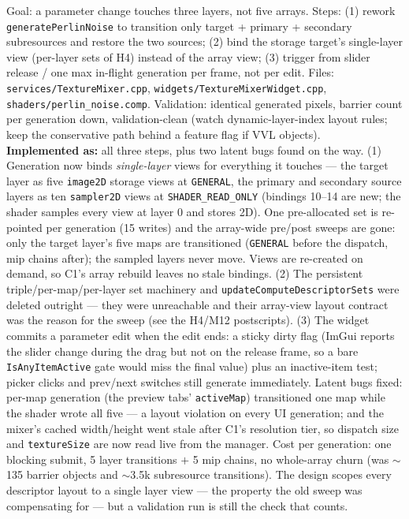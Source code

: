 \documentclass[11pt,a4paper]{article}
\begin{document}
\begin{tcolorbox}[promptbox={Prompt --- C2: layer-local, commit-on-release generation}]
Goal: a parameter change touches three layers, not five arrays. Steps:
(1) rework \texttt{generatePerlinNoise} to transition only target + primary +
secondary subresources and restore the two sources; (2) bind the storage
target's single-layer view (per-layer sets of H4) instead of the array view;
(3) trigger from slider release / one max in-flight generation per frame, not
per edit. Files: \texttt{services/TextureMixer.cpp},
\texttt{widgets/TextureMixerWidget.cpp}, \texttt{shaders/perlin\_noise.comp}.
Validation: identical generated pixels, barrier count per generation down,
validation-clean (watch dynamic-layer-index layout rules; keep the conservative
path behind a feature flag if VVL objects).
\\ \textbf{Implemented as:} all three steps, plus two latent bugs found on the
way. (1) Generation now binds \emph{single-layer} views for everything it
touches --- the target layer as five \texttt{image2D} storage views at
\texttt{GENERAL}, the primary and secondary source layers as ten
\texttt{sampler2D} views at \texttt{SHADER\_READ\_ONLY} (bindings 10--14 are
new; the shader samples every view at layer 0 and stores 2D). One
pre-allocated set is re-pointed per generation (15 writes) and the array-wide
pre/post sweeps are gone: only the target layer's five maps are transitioned
(\texttt{GENERAL} before the dispatch, mip chains after); the sampled layers
never move. Views are re-created on demand, so C1's array rebuild leaves no
stale bindings. (2) The persistent triple/per-map/per-layer set machinery and
\texttt{updateComputeDescriptorSets} were deleted outright --- they were
unreachable and their array-view layout contract was the reason for the sweep
(see the H4/M12 postscripts). (3) The widget commits a parameter edit when
the edit ends: a sticky dirty flag (ImGui reports the slider change during
the drag but not on the release frame, so a bare \texttt{IsAnyItemActive}
gate would miss the final value) plus an inactive-item test; picker clicks
and prev/next switches still generate immediately. Latent bugs fixed: per-map
generation (the preview tabs' \texttt{activeMap}) transitioned one map while
the shader wrote all five --- a layout violation on every UI generation; and
the mixer's cached width/height went stale after C1's resolution tier, so
dispatch size and \texttt{textureSize} are now read live from the manager.
Cost per generation: one blocking submit, 5 layer transitions $+$ 5 mip
chains, no whole-array churn (was $\sim$135 barrier objects and
$\sim$3.5k subresource transitions). The design scopes every descriptor
layout to a single layer view --- the property the old sweep was
compensating for --- but a validation run is still the check that counts.
\end{tcolorbox}
\end{document}
